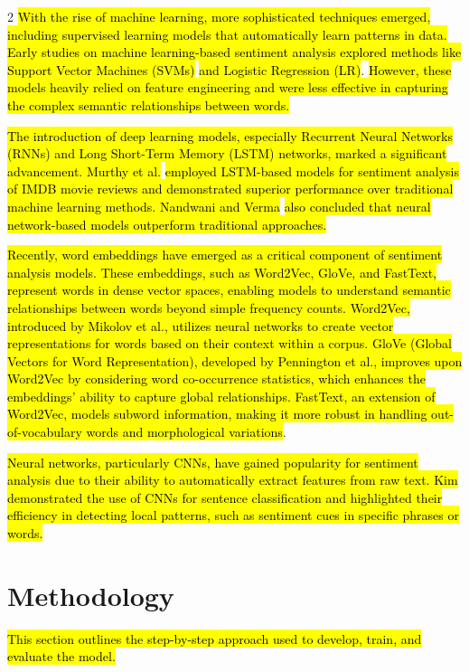 \documentclass[10pt,a4paper]{article}
\begin{document}
\begin{multicols}{2}
\hl{With the rise of machine learning, more sophisticated techniques emerged, including supervised learning models that automatically learn patterns in data. Early studies on machine learning-based sentiment analysis explored methods like Support Vector Machines (SVMs)}\cite{wang2024word2vec} \hl{and Logistic Regression (LR)}\cite{ghosh2022sentiment}. \hl{However, these models heavily relied on feature engineering and were less effective in capturing the complex semantic relationships between words.}

\hl{The introduction of deep learning models, especially Recurrent Neural Networks (RNNs) and Long Short-Term Memory (LSTM) networks, marked a significant advancement. Murthy et al.}\cite{murthy2020text} \hl{employed LSTM-based models for sentiment analysis of IMDB movie reviews and demonstrated superior performance over traditional machine learning methods. Nandwani and Verma}\cite{nandwani2021review} \hl{also concluded that neural network-based models outperform traditional approaches.} 

\hl{Recently, word embeddings have emerged as a critical component of sentiment analysis models. These embeddings, such as Word2Vec, GloVe, and FastText, represent words in dense vector spaces, enabling models to understand semantic relationships between words beyond simple frequency counts. Word2Vec, introduced by Mikolov et al.}\cite{mikolov2013efficient}\hl{, utilizes neural networks to create vector representations for words based on their context within a corpus. GloVe (Global Vectors for Word Representation), developed by Pennington et al.}\cite{pennington2014glove}\hl{, improves upon Word2Vec by considering word co-occurrence statistics, which enhances the embeddings' ability to capture global relationships. FastText, an extension of Word2Vec, models subword information, making it more robust in handling out-of-vocabulary words and morphological variations}\cite{bojanowski2017enriching}.

\hl{Neural networks, particularly CNNs, have gained popularity for sentiment analysis due to their ability to automatically extract features from raw text. Kim}\cite{kim2014convolutional} \hl{demonstrated the use of CNNs for sentence classification and highlighted their efficiency in detecting local patterns, such as sentiment cues in specific phrases or words. }

\section*{Methodology}
\hl{This section outlines the step-by-step approach used to develop, train, and evaluate the model.}



\end{multicols}
\end{document}
